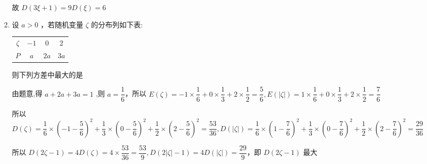 \begin{enumerate}
\begin{enumerate}
\begin{jieda}
            故 $D\left( {{3\xi } + 1}\right)  = {9D}\left( \xi \right)  = 6$
        \end{jieda}

        \item 设 $a > 0$ ，若随机变量 $\zeta$ 的分布列如下表:

        \begin{center}
        
        \begin{tabular}{|c|c|c|c|}
        \hline
        $\zeta$ & $-1$ & $0$ & $2$ \\
        \cline{1-4}
        $P$ & $a$ & ${2a}$ & ${3a}$ \\
        \cline{1-4}
        \hline
        \end{tabular}
        
        \end{center}
        
        则下列方差中最大的是
        \begin{jieda}
            由题意,得 $a + {2a} + {3a} = 1$ ,则 $a = \dfrac{1}{6}$，所以 $E\left( \zeta \right)  =  - 1 \times  \dfrac{1}{6} + 0 \times  \dfrac{1}{3} + 2 \times  \dfrac{1}{2} = \dfrac{5}{6},E\left( \left| \zeta \right| \right)  = 1 \times  \dfrac{1}{6} + 0 \times  \dfrac{1}{3} + 2 \times  \dfrac{1}{2} = \dfrac{7}{6}$
            
            所以 $D\left( \zeta \right)  = \dfrac{1}{6} \times  {\left( -1 - \dfrac{5}{6}\right) }^{2} + \dfrac{1}{3} \times  {\left( 0 - \dfrac{5}{6}\right) }^{2} + \dfrac{1}{2} \times  {\left( 2 - \dfrac{5}{6}\right) }^{2} = \dfrac{53}{36},D\left( \left| \zeta \right| \right)  = \dfrac{1}{6} \times  {\left( 1 - \dfrac{7}{6}\right) }^{2} + \dfrac{1}{3} \times  {\left( 0 - \dfrac{7}{6}\right) }^{2} + \dfrac{1}{2} \times {\left( 2 - \dfrac{7}{6}\right) }^{2} = \dfrac{29}{36}$
            
            所以 $D\left( {{2\zeta } - 1}\right)  = {4D}\left( \zeta \right)  = 4 \times  \dfrac{53}{36} = \dfrac{53}{9},D\left( {2\left| \zeta \right|  - 1}\right)  = {4D}\left( \left| \zeta \right| \right)  = \dfrac{29}{9}$，即 $D\left( {{2\zeta } - 1}\right)$ 最大
        \end{jieda}
        

\end{enumerate}
\end{enumerate}
